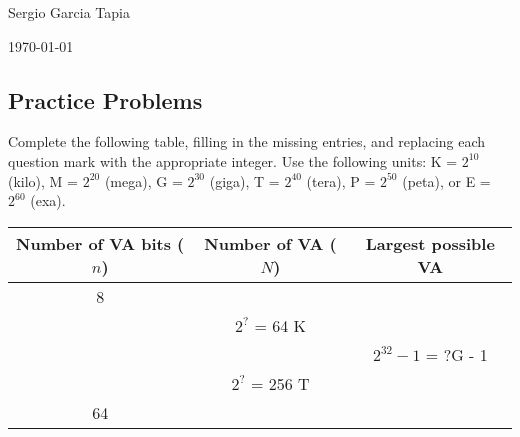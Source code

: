 \documentclass[12pt]{article}
\newenvironment{ex}[2][Exercise]{\begin{trivlist}
		\item[\hskip \labelsep {\bfseries #1}\hskip \labelsep {\bfseries #2.}]}{\end{trivlist}}
\begin{document}

\noindent Sergio Garcia Tapia \hfill

 \hfill


\noindent\today

\subsection*{Practice Problems}

\begin{ex}{9.1}
	Complete the following table, filling in the missing entries, and replacing each question
	mark with the appropriate integer. Use the following units: K = $2^{10}$ (kilo), M = $2^{20}$
	(mega), G = $2^{30}$ (giga), T = $2^{40}$ (tera), P = $2^{50}$ (peta), or E = $2^{60}$ (exa).
	\begin{center}
		\begin{tabular}{ccc}
			Number of VA bits ($n$) & Number of VA ($N$) & Largest possible VA\\
			\hline
			8 & \makebox[1cm]{\hrulefill} & \makebox[1cm]{\hrulefill}\\
			\makebox[1cm]{\hrulefill} & $2^{?}$ = 64 K & \makebox[1cm]{\hrulefill}\\
			\makebox[1cm]{\hrulefill} & \makebox[1cm]{\hrulefill} & $2^{32} - 1$ = ?G - 1\\
			\makebox[1cm]{\hrulefill} & $2^{?}$ = 256 T & \makebox[1cm]{\hrulefill}\\
			64 & \makebox[1cm]{\hrulefill} & \makebox[1cm]{\hrulefill}
		\end{tabular}
	\end{center}
\end{ex}
\end{document}
